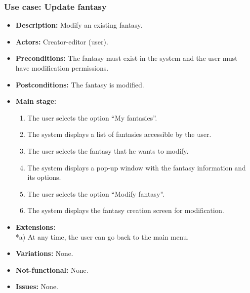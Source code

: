 \subsubsection{Use case: Update fantasy}
\begin{itemize}
	\item \textbf{Description:} Modify an existing fantasy.
	\item \textbf{Actors:} Creator-editor (user).
	\item \textbf{Preconditions:} The fantasy must exist in the system and the user must have modification permissions.
	\item \textbf{Postconditions:} The fantasy is modified.
	\item \textbf{Main stage:}
	\begin{enumerate}
		\item The user selects the option ``My fantasies''.
		\item The system displays a list of fantasies accessible by the user.
		\item The user selects the fantasy that he wants to modify.
		\item The system displays a pop-up window with the fantasy information and its options.
		\item The user selects the option ``Modify fantasy''.
		\item The system displays the fantasy creation screen for modification.
	\end{enumerate}
	\item \textbf{Extensions:} \\ *a) At any time, the user can go back to the main menu.
	\item \textbf{Variations:} None.
	\item \textbf{Not-functional:} None.
	\item \textbf{Issues:} None.
\end{itemize}

